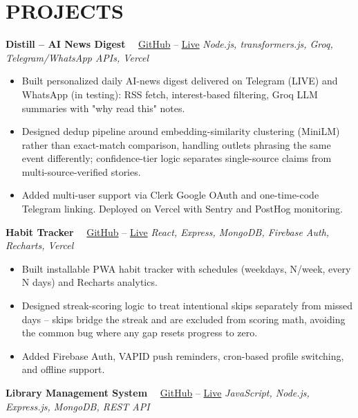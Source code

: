 \documentclass[letterpaper,11pt]{article}
\begin{document}
\section*{PROJECTS}

\noindent\textbf{Distill – AI News Digest}  \ \
\textcolor{blue}{\href{https://github.com/Rithwik007/AI_NEWS_DESK}{GitHub}} --  \textcolor{blue}{\href{https://ai-news-desk-ecru.vercel.app/}{Live}} \hfill \textit{Node.js, transformers.js, Groq, Telegram/WhatsApp APIs, Vercel}


\begin{itemize}
\item Built personalized daily AI-news digest delivered on Telegram (LIVE) and WhatsApp (in testing): RSS fetch, interest-based filtering, Groq LLM summaries with "why read this" notes.
\item Designed dedup pipeline around embedding-similarity clustering (MiniLM) rather than exact-match comparison, handling outlets phrasing the same event differently; confidence-tier logic separates single-source claims from multi-source-verified stories.
\item Added multi-user support via Clerk Google OAuth and one-time-code Telegram linking. Deployed on Vercel with Sentry and PostHog monitoring.

\end{itemize}



\noindent\textbf{Habit Tracker} \ \
\textcolor{blue}{\href{https://github.com/Rithwik007/habit-tracker-web2}{GitHub}}  --  \textcolor{blue}{\href{https://habit-tracker-web2.vercel.app/}{Live}}  \hfill \textit{React, Express, MongoDB, Firebase Auth, Recharts, Vercel}

\begin{itemize}
\item Built installable PWA habit tracker with schedules (weekdays, N/week, every N days) and Recharts analytics. 
\item Designed streak-scoring logic to treat intentional skips separately from missed days -- skips bridge the streak and are excluded from scoring math, avoiding the common bug where any gap resets progress to zero.
\item Added Firebase Auth, VAPID push reminders, cron-based profile switching, and offline support.

\end{itemize}

\noindent\textbf{Library Management System} \ \ 
\textcolor{blue}{\href{https://github.com/Rithwik007/Library-Management}{GitHub}} --  \textcolor{blue}{\href{https://library-management-frontend-ten-tan.vercel.app}{Live}} \hfill \textit{JavaScript, Node.js, Express.js, MongoDB, REST API}
\end{document}
